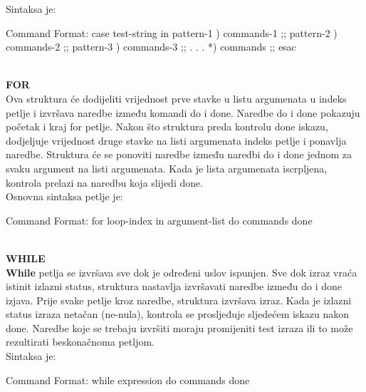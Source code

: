 \documentclass[11pt]{book}
\begin{document}
Sintaksa je:\\

\begin{shortlisting}
Command Format:  case test-string in
                        pattern-1 ) commands-1 ;;
                        pattern-2 ) commands-2 ;;
                        pattern-3 ) commands-3 ;;
                        .
                        .
                        .
                        *)          commands   ;;
                   esac
\end{shortlisting}\\

\textbf{FOR}\\  

Ova struktura će dodijeliti vrijednost prve stavke u listu argumenata u indeks petlje i izvršava naredbe između komandi do i done. Naredbe do i done pokazuju početak i kraj for petlje. 
Nakon što struktura preda kontrolu done iskazu, dodjeljuje vrijednost druge stavke na listi argumenata indeks petlje i ponavlja naredbe. Struktura će se ponoviti naredbe između naredbi do i done jednom za svaku argument na listi argumenata. Kada je lista argumenata iscrpljena, kontrola prelazi na naredbu koja slijedi done.\\

Osnovna sintaksa petlje je:\\

\begin{shortlisting}
Command Format:  for loop-index in argument-list
                        do
                        commands
                        done
\end{shortlisting}\\

\textbf{WHILE}\\

\textbf{While} petlja se izvršava sve dok je određeni uslov ispunjen.
Sve dok izraz vraća istinit izlazni status, struktura nastavlja izvršavati naredbe između do i done izjava. Prije svake petlje kroz naredbe, struktura izvršava izraz. Kada je izlazni status izraza netačan (ne-nula), kontrola se prosljeđuje sljedećem iskazu nakon done. Naredbe koje se trebaju izvršiti moraju promijeniti test izraza ili to može rezultirati beskonačnoma petljom.\\

Sintaksa je:\\

\begin{shortlisting}
Command Format:  while expression
                        do
                        commands
                        done
\end{shortlisting}\\
\end{document}
